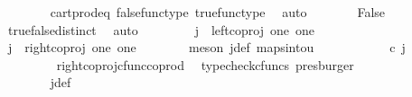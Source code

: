 \begin{isabellebody}
\ \ \ \ \ \ \isamarkupfalse%
\ cart{\isacharunderscore}{\kern0pt}prod{\isacharunderscore}{\kern0pt}eq{}\ false{\isacharunderscore}{\kern0pt}func{\isacharunderscore}{\kern0pt}type\ true{\isacharunderscore}{\kern0pt}func{\isacharunderscore}{\kern0pt}type\ \isamarkupfalse%
\ auto\isanewline
\ \ \ \ \isamarkupfalse%
\ \isamarkupfalse%
\ False\isanewline
\ \ \ \ \ \ \isamarkupfalse%
\ true{\isacharunderscore}{\kern0pt}false{\isacharunderscore}{\kern0pt}distinct\ \isamarkupfalse%
\ auto\isanewline
\ \ \isamarkupfalse%
\isanewline
\ \ \ \ \isamarkupfalse%
\ {\isachardoublequoteopen}j\ {\isasymnoteq}\ left{\isacharunderscore}{\kern0pt}coproj\ one\ one{\isachardoublequoteclose}\isanewline
\ \ \ \ \isamarkupfalse%
\ \isamarkupfalse%
\ {\isachardoublequoteopen}j\ {\isacharequal}{\kern0pt}\ right{\isacharunderscore}{\kern0pt}coproj\ one\ one{\isachardoublequoteclose}\isanewline
\ \ \ \ \ \ \isamarkupfalse%
\ {\isacharparenleft}{\kern0pt}meson\ j{\isacharunderscore}{\kern0pt}def\ maps{\isacharunderscore}{\kern0pt}into{\isacharunderscore}{\kern0pt}{}u{}{\isacharparenright}{\kern0pt}\isanewline
\ \ \ \ \isamarkupfalse%
\ \isamarkupfalse%
\ {\isachardoublequoteopen}{\isacharparenleft}{\kern0pt}{\isasymlangle}{\isasymt}{\isacharcomma}{\kern0pt}\ {\isasymf}{\isasymrangle}\ {\isasymamalg}{\isasymlangle}{\isasymf}{\isacharcomma}{\kern0pt}\ {\isasymt}{\isasymrangle}{\isacharparenright}{\kern0pt}\ {\isasymcirc}\isactrlsub c\ j\ \ {\isacharequal}{\kern0pt}\ {\isasymlangle}{\isasymf}{\isacharcomma}{\kern0pt}\ {\isasymt}{\isasymrangle}{\isachardoublequoteclose}\isanewline
\ \ \ \ \ \ \isamarkupfalse%
\ \ right{\isacharunderscore}{\kern0pt}coproj{\isacharunderscore}{\kern0pt}cfunc{\isacharunderscore}{\kern0pt}coprod\ \isamarkupfalse%
\ {\isacharparenleft}{\kern0pt}typecheck{\isacharunderscore}{\kern0pt}cfuncs{\isacharcomma}{\kern0pt}\ presburger{\isacharparenright}{\kern0pt}\isanewline
\ \ \ \ \isamarkupfalse%
\ \isamarkupfalse%
\ {\isachardoublequoteopen}{\isasymlangle}{\isasymf}{\isacharcomma}{\kern0pt}\ {\isasymt}{\isasymrangle}\ {\isacharequal}{\kern0pt}\ {\isasymlangle}{\isasymf}{\isacharcomma}{\kern0pt}{\isasymf}{\isasymrangle}{\isachardoublequoteclose}\isanewline
\ \ \ \ \ \ \isamarkupfalse%
\ j{\isacharunderscore}{\kern0pt}def\ \isamarkupfalse%

\end{isabellebody}
